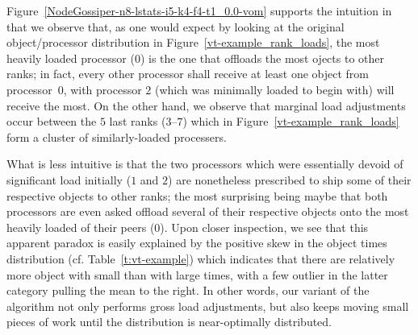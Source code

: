 Figure~\ref{NodeGossiper-n8-lstats-i5-k4-f4-t1_0.0-vom} supports
the intuition in that we observe that, as one would expect by looking at
the original object/processor distribution in
Figure~\ref{vt-example_rank_loads}, the most heavily loaded processor
($0$) is the one that offloads the most ojects to other ranks; in
fact, every other processor shall receive at least one object from
processor~$0$, with processor $2$ (which was minimally loaded to begin
with) will receive the most.
On the other hand, we observe that marginal load adjustments occur
between the $5$ last ranks ($3$--$7$) which in
Figure~\ref{vt-example_rank_loads} form a cluster of similarly-loaded
processers.

What is less intuitive is that the two processors which were
essentially devoid of significant load initially ($1$ and $2$) are
nonetheless prescribed to ship some of their respective objects to
other ranks; the most surprising being maybe that both processors are
even asked offload several of their respective objects onto the most
heavily loaded of their peers ($0$). 
Upon closer inspection, we see that this apparent paradox is easily
explained by the positive skew in the object times distribution
(cf. Table~\ref{t:vt-example}) which indicates that there are
relatively more object with small than with large times, with a few
outlier in the latter category pulling the mean to the right.
In other words, our variant of the algorithm not only performs gross
load adjustments, but also keeps moving small pieces of work until the
distribution is near-optimally distributed.